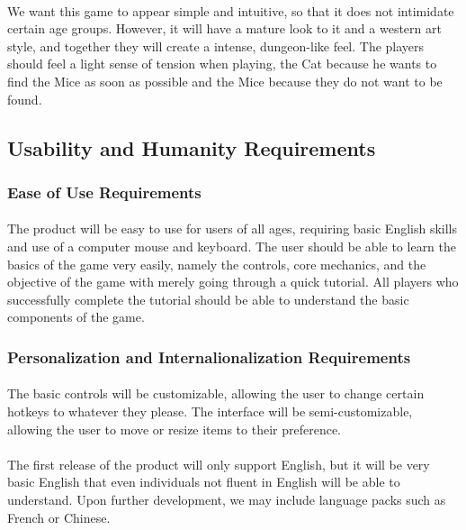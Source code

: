 \documentclass[12pt, titlepage]{article}
\begin{document}
\paragraph{}We want this game to appear simple and intuitive, so that it does not intimidate certain age groups. However, it will have a mature look to it and a western art style, and together they will create a intense, dungeon-like feel. The players should feel a light sense of tension when playing, the Cat because he wants to find the Mice as soon as possible and the Mice because they do not want to be found.  
\subsection{Usability and Humanity Requirements}
\subsubsection{Ease of Use Requirements}
\paragraph{}The product will be easy to use for users of all ages, requiring basic English skills and use of a computer mouse and keyboard. The user should be able to learn the basics of the game very easily, namely the controls, core mechanics, and the objective of the game with merely going through a quick tutorial. All players who successfully complete the tutorial should be able to understand the basic components of the game. 
\subsubsection{Personalization and Internalionalization Requirements}
\paragraph{}The basic controls will be customizable, allowing the user to change certain hotkeys to whatever they please. The interface will be semi-customizable, allowing the user to move or resize items to their preference. 
\paragraph{}The first release of the product will only support English, but it will be very basic English that even individuals not fluent in English will be able to understand. Upon further development, we may include language packs such as French or Chinese. 
\end{document}
